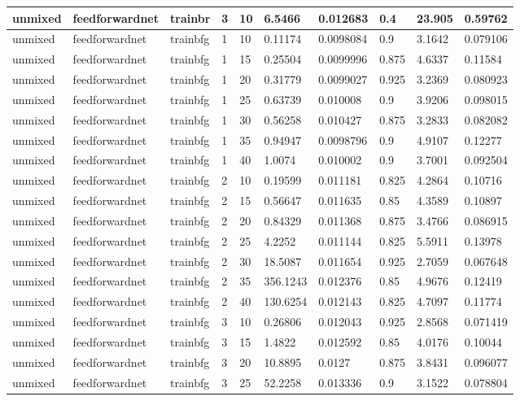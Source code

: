 \begin{longtable}{lllllllll}
unmixed & feedforwardnet & trainbr & 3 & 10 & 6.5466 & 0.012683 & 0.4 & 23.905 & 0.59762 \\ \hline 
unmixed & feedforwardnet & trainbfg & 1 & 10 & 0.11174 & 0.0098084 & 0.9 & 3.1642 & 0.079106 \\ \hline 
unmixed & feedforwardnet & trainbfg & 1 & 15 & 0.25504 & 0.0099996 & 0.875 & 4.6337 & 0.11584 \\ \hline 
unmixed & feedforwardnet & trainbfg & 1 & 20 & 0.31779 & 0.0099027 & 0.925 & 3.2369 & 0.080923 \\ \hline 
unmixed & feedforwardnet & trainbfg & 1 & 25 & 0.63739 & 0.010008 & 0.9 & 3.9206 & 0.098015 \\ \hline 
unmixed & feedforwardnet & trainbfg & 1 & 30 & 0.56258 & 0.010427 & 0.875 & 3.2833 & 0.082082 \\ \hline 
unmixed & feedforwardnet & trainbfg & 1 & 35 & 0.94947 & 0.0098796 & 0.9 & 4.9107 & 0.12277 \\ \hline 
unmixed & feedforwardnet & trainbfg & 1 & 40 & 1.0074 & 0.010002 & 0.9 & 3.7001 & 0.092504 \\ \hline 
unmixed & feedforwardnet & trainbfg & 2 & 10 & 0.19599 & 0.011181 & 0.825 & 4.2864 & 0.10716 \\ \hline 
unmixed & feedforwardnet & trainbfg & 2 & 15 & 0.56647 & 0.011635 & 0.85 & 4.3589 & 0.10897 \\ \hline 
unmixed & feedforwardnet & trainbfg & 2 & 20 & 0.84329 & 0.011368 & 0.875 & 3.4766 & 0.086915 \\ \hline 
unmixed & feedforwardnet & trainbfg & 2 & 25 & 4.2252 & 0.011144 & 0.825 & 5.5911 & 0.13978 \\ \hline 
unmixed & feedforwardnet & trainbfg & 2 & 30 & 18.5087 & 0.011654 & 0.925 & 2.7059 & 0.067648 \\ \hline 
unmixed & feedforwardnet & trainbfg & 2 & 35 & 356.1243 & 0.012376 & 0.85 & 4.9676 & 0.12419 \\ \hline 
unmixed & feedforwardnet & trainbfg & 2 & 40 & 130.6254 & 0.012143 & 0.825 & 4.7097 & 0.11774 \\ \hline 
unmixed & feedforwardnet & trainbfg & 3 & 10 & 0.26806 & 0.012043 & 0.925 & 2.8568 & 0.071419 \\ \hline 
unmixed & feedforwardnet & trainbfg & 3 & 15 & 1.4822 & 0.012592 & 0.85 & 4.0176 & 0.10044 \\ \hline 
unmixed & feedforwardnet & trainbfg & 3 & 20 & 10.8895 & 0.0127 & 0.875 & 3.8431 & 0.096077 \\ \hline 
unmixed & feedforwardnet & trainbfg & 3 & 25 & 52.2258 & 0.013336 & 0.9 & 3.1522 & 0.078804 \\ \hline 

\end{longtable}
